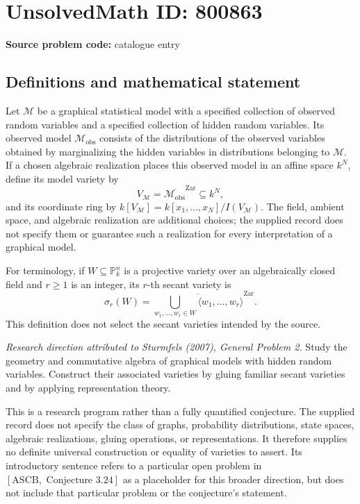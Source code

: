 \documentclass[11pt]{article}
\newcommand{\PP}{\mathbb{P}}
\begin{document}
\section*{UnsolvedMath ID: 800863}
\textbf{Source problem code:} catalogue entry
\subsection{Definitions and mathematical statement}
Let \(\mathcal M\) be a graphical statistical model with a specified collection of observed random variables and a specified collection of hidden random variables. Its observed model \(\mathcal M_{\mathrm{obs}}\) consists of the distributions of the observed variables obtained by marginalizing the hidden variables in distributions belonging to \(\mathcal M\). If a chosen algebraic realization places this observed model in an affine space \(k^N\), define its model variety by
\[
V_{\mathcal M}=\overline{\mathcal M_{\mathrm{obs}}}^{\mathrm{Zar}}\subseteq k^N,
\]
and its coordinate ring by \(k[V_{\mathcal M}]=k[x_1,\ldots,x_N]/I(V_{\mathcal M})\). The field, ambient space, and algebraic realization are additional choices; the supplied record does not specify them or guarantee such a realization for every interpretation of a graphical model.

For terminology, if \(W\subseteq\PP^n_k\) is a projective variety over an algebraically closed field and \(r\geq1\) is an integer, its \(r\)-th secant variety is
\[
\sigma_r(W)=\overline{\bigcup_{w_1,\ldots,w_r\in W}\langle w_1,\ldots,w_r\rangle}^{\mathrm{Zar}}.
\]
This definition does not select the secant varieties intended by the source.

\emph{Research direction attributed to Sturmfels (2007), General Problem 2.} Study the geometry and commutative algebra of graphical models with hidden random variables. Construct their associated varieties by gluing familiar secant varieties and by applying representation theory.

This is a research program rather than a fully quantified conjecture. The supplied record does not specify the class of graphs, probability distributions, state spaces, algebraic realizations, gluing operations, or representations. It therefore supplies no definite universal construction or equality of varieties to assert. Its introductory sentence refers to a particular open problem in \([\mathrm{ASCB},\text{ Conjecture }3.24]\) as a placeholder for this broader direction, but does not include that particular problem or the conjecture's statement.
\end{document}
